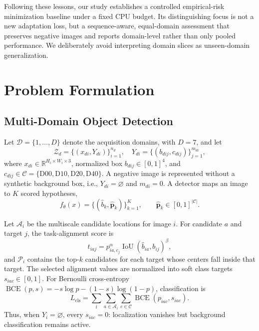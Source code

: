 \documentclass[conference]{ieee-template/vendor/IEEEtran/IEEEtran}
\begin{document}
Following these lessons, our study establishes a controlled empirical-risk
minimization baseline under a fixed CPU budget. Its distinguishing focus is not
a new adaptation loss, but a sequence-aware, equal-domain assessment that
preserves negative images and reports domain-level rather than only pooled
performance. We deliberately avoid interpreting domain slices as unseen-domain
generalization.

\section{Problem Formulation}
\label{sec:formulation}

\subsection{Multi-Domain Object Detection}
Let $\mathcal{D}=\{1,\ldots,D\}$ denote the acquisition domains, with $D=7$,
and let
\begin{equation}
 \mathcal{Z}_d=\{(x_{di},Y_{di})\}_{i=1}^{n_d},\quad
 Y_{di}=\{(b_{dij},c_{dij})\}_{j=1}^{m_{di}},
 \label{eq:domain-data}
\end{equation}
where $x_{di}\in\mathbb{R}^{H_i\times W_i\times3}$, normalized box
$b_{dij}\in[0,1]^4$, and $c_{dij}\in\mathcal{C}=\{\mathrm{D00},
\mathrm{D10},\mathrm{D20},\mathrm{D40}\}$. A negative image is represented
without a synthetic background box, i.e., $Y_{di}=\varnothing$ and $m_{di}=0$.
A detector maps an image to $K$ scored hypotheses,
\begin{equation}
 f_\theta(x)=\{(\hat b_k,\hat{\boldsymbol p}_k)\}_{k=1}^{K},
 \qquad \hat{\boldsymbol p}_k\in[0,1]^{|\mathcal C|}.
 \label{eq:detector}
\end{equation}

Let $\mathcal A_i$ be the multiscale candidate locations for image $i$. For
candidate $a$ and target $j$, the task-alignment score is
\begin{equation}
 t_{iaj}=p_{ia,c_j}^{\alpha}
 \operatorname{IoU}(\hat b_{ia},b_{ij})^{\beta},
 \label{eq:task-alignment}
\end{equation}
and $\mathcal P_i$ contains the top-$k$ candidates for each target whose centers
fall inside that target. The selected alignment values are normalized into soft
class targets $s_{iac}\in[0,1]$. For Bernoulli cross-entropy
$\operatorname{BCE}(p,s)=-s\log p-(1-s)\log(1-p)$, classification is
\begin{equation}
 L_{\mathrm{cls}}=\sum_i\sum_{a\in\mathcal A_i}
 \sum_{c\in\mathcal C}\operatorname{BCE}(p_{iac},s_{iac}).
 \label{eq:yolo-cls}
\end{equation}
Thus, when $Y_i=\varnothing$, every $s_{iac}=0$: localization vanishes but
background classification remains active.
\end{document}
